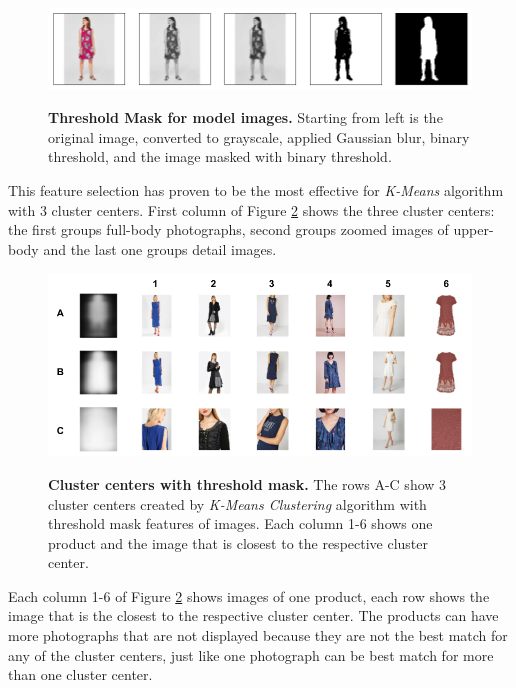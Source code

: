 \documentclass{article}
\begin{document}
\begin{figure}[h]
\centering
{\includegraphics[width=\linewidth]{clustering/outlines_data}}
\caption{\label{fig:cluster_outline_data} \textbf{Threshold Mask for model images.} Starting from left is the original image, converted to grayscale, applied Gaussian blur, binary threshold, and the image masked with binary threshold.}
\end{figure}

This feature selection has proven to be the most effective for \textit{K-Means} algorithm with 3 cluster centers. First column of Figure \ref{fig:cluster_outline} shows the three cluster centers: the first groups full-body photographs, second groups zoomed images of upper-body and the last one groups detail images. 

\begin{figure}[h]
\centering
{\includegraphics[width=\linewidth]{clustering/outlines_clusters}}
\caption{\label{fig:cluster_outline} \textbf{Cluster centers with threshold mask.} The rows A-C show 3 cluster centers created by \textit{K-Means Clustering} algorithm with threshold mask features of images. Each column 1-6 shows one product and the image that is closest to the respective cluster center.}
\end{figure}

Each column 1-6 of Figure \ref{fig:cluster_outline} shows images of one product, each row shows the image that is the closest to the respective cluster center. The products can have more photographs that are not displayed because they are not the best match for any of the cluster centers, just like one photograph can be best match for more than one cluster center. 
\end{document}
